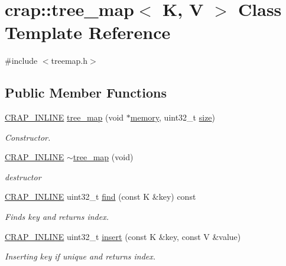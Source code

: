 \hypertarget{classcrap_1_1tree__map}{\section{crap\+:\+:tree\+\_\+map$<$ K, V $>$ Class Template Reference}
\label{classcrap_1_1tree__map}
}


{\ttfamily \#include $<$treemap.\+h$>$}

\subsection*{Public Member Functions}
\begin{DoxyCompactItemize}
\item 
\hyperlink{config__x86_8h_a5a40526b8d842e7ff731509998bb0f1c}{C\+R\+A\+P\+\_\+\+I\+N\+L\+I\+N\+E} \hyperlink{classcrap_1_1tree__map_a6a4a68fa3fb61c3d9d97e1575a638736}{tree\+\_\+map} (void $\ast$\hyperlink{classcrap_1_1tree__map_a478da4a9798b325ef27494a2c9a178f4}{memory}, uint32\+\_\+t \hyperlink{classcrap_1_1tree__map_a8f64f41ca15631a937cbca9c8e6fdcec}{size})
\begin{DoxyCompactList}\small\item\em Constructor. \end{DoxyCompactList}\item 
\hyperlink{config__x86_8h_a5a40526b8d842e7ff731509998bb0f1c}{C\+R\+A\+P\+\_\+\+I\+N\+L\+I\+N\+E} \hyperlink{classcrap_1_1tree__map_a0b2a381e1a3627fdb4394d795162f50b}{$\sim$tree\+\_\+map} (void)
\begin{DoxyCompactList}\small\item\em destructor \end{DoxyCompactList}\item 
\hyperlink{config__x86_8h_a5a40526b8d842e7ff731509998bb0f1c}{C\+R\+A\+P\+\_\+\+I\+N\+L\+I\+N\+E} uint32\+\_\+t \hyperlink{classcrap_1_1tree__map_a46b641ad05589465628201f999153638}{find} (const K \&key) const 
\begin{DoxyCompactList}\small\item\em Finds key and returns index. \end{DoxyCompactList}\item 
\hyperlink{config__x86_8h_a5a40526b8d842e7ff731509998bb0f1c}{C\+R\+A\+P\+\_\+\+I\+N\+L\+I\+N\+E} uint32\+\_\+t \hyperlink{classcrap_1_1tree__map_a413036914eb0b67e78f13ea57d8c586e}{insert} (const K \&key, const V \&value)
\begin{DoxyCompactList}\small\item\em Inserting key if unique and returns index. \end{DoxyCompactList}\item 

\end{DoxyCompactItemize}
